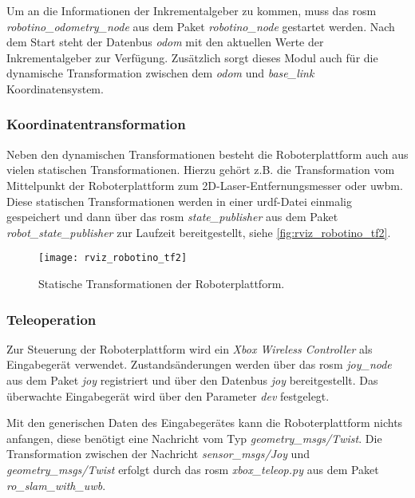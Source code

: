 Um an die Informationen der Inkrementalgeber zu kommen, muss das \Gls{rosm} \textit{robotino\_odometry\_node} aus dem Paket \textit{robotino\_node} gestartet werden. Nach dem Start steht der Datenbus \textit{odom} mit den aktuellen Werte der Inkrementalgeber zur Verfügung. Zusätzlich sorgt dieses Modul auch für die dynamische Transformation zwischen dem \textit{odom} und \textit{base\_link} Koordinatensystem.


%
%
\subsubsection{Koordinatentransformation}

Neben den dynamischen Transformationen besteht die Roboterplattform auch aus vielen statischen Transformationen. Hierzu gehört z.B. die Transformation vom Mittelpunkt der Roboterplattform zum 2D-Laser-Entfernungsmesser oder \Gls{uwbm}. Diese statischen Transformationen werden in einer \Gls{urdf}-Datei einmalig gespeichert und dann über das \Gls{rosm} \textit{state\_publisher} aus dem Paket \textit{robot\_state\_publisher} zur Laufzeit bereitgestellt, siehe \autoref{fig:rviz_robotino_tf2}.

\begin{figure}
	\centering
	\texttt{[image: rviz\_robotino\_tf2]}
	\caption{Statische Transformationen der Roboterplattform.}
	\label{fig:rviz_robotino_tf2}
\end{figure}


%
%
\subsubsection{Teleoperation}

Zur Steuerung der Roboterplattform wird ein \textit{Xbox Wireless Controller} als Eingabegerät verwendet. Zustandsänderungen werden über das \Gls{rosm} \textit{joy\_node} aus dem Paket \textit{joy} registriert und über den Datenbus \textit{joy} bereitgestellt. Das überwachte Eingabegerät wird über den Parameter \textit{dev} festgelegt.

Mit den generischen Daten des Eingabegerätes kann die Roboterplattform nichts anfangen, diese benötigt eine Nachricht vom Typ \textit{geometry\_msgs/Twist}. Die Transformation zwischen der Nachricht \textit{sensor\_msgs/Joy} und \textit{geometry\_msgs/Twist} erfolgt durch das \Gls{rosm} \textit{xbox\_teleop.py} aus dem Paket \textit{ro\_slam\_with\_uwb}.


